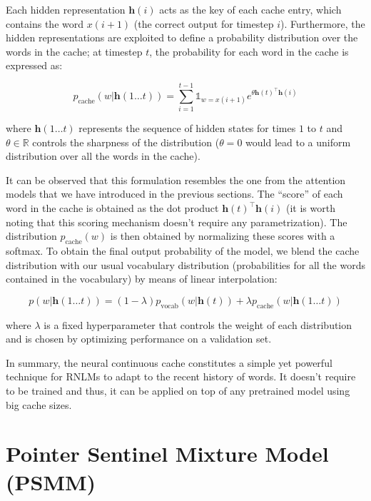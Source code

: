 Each hidden representation $\mathbf{h}(i)$ acts as the key of each cache entry, which contains the word $x(i+1)$ (the correct output for timestep $i$). Furthermore, the hidden representations are exploited to define a probability distribution over the words in the cache; at timestep $t$, the probability for each word in the cache is expressed as:

\begin{equation} \label{eq:cacheProb}
	p_{\text{cache}}(w|\mathbf{h}(1\ldots t)) = \sum_{i=1}^{t-1} \mathbb{1}_{w=x(i+1)} e^{\theta\mathbf{h}(t)^{\top}\mathbf{h}(i)}
\end{equation}

where $\mathbf{h}(1\ldots t)$ represents the sequence of hidden states for times $1$ to $t$ and $\theta \in \mathbb{R}$ controls the sharpness of the distribution ($\theta=0$ would lead to a uniform distribution over all the words in the cache).

It can be observed that this formulation resembles the one from the attention models that we have introduced in the previous sections. The ``score'' of each word in the cache is obtained as the dot product $\mathbf{h}(t)^{\top}\mathbf{h}(i)$ (it is worth noting that this scoring mechanism doesn't require any parametrization). The distribution $p_{\text{cache}}(w)$ is then obtained by normalizing these scores with a softmax. To obtain the final output probability of the model, we blend the cache distribution with our usual vocabulary distribution (probabilities for all the words contained in the vocabulary) by means of linear interpolation:

\begin{equation} \label{eq:contCache}
	p(w|\mathbf{h}(1\ldots t)) = (1-\lambda)p_{\text{vocab}}(w|\mathbf{h}(t)) + \lambda p_{\text{cache}}(w|\mathbf{h}(1\ldots t))
\end{equation}

where $\lambda$ is a fixed hyperparameter that controls the weight of each distribution and is chosen by optimizing performance on a validation set. 

In summary, the neural continuous cache constitutes a simple yet powerful technique for RNLMs to adapt to the recent history of words. It doesn't require to be trained and thus, it can be applied on top of any pretrained model using big cache sizes.

\section{Pointer Sentinel Mixture Model (PSMM)}
\label{sec:pointerMixture}

